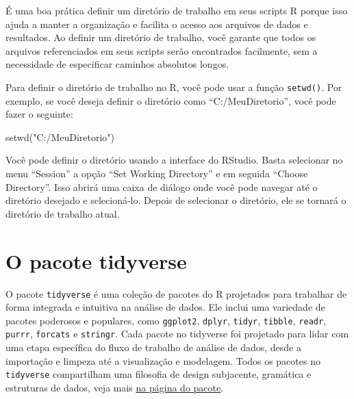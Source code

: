 \documentclass[
  portuguese,
  letterpaper,
  DIV=11,
  numbers=noendperiod]{scrreprt}
\newenvironment{Shaded}{\begin{snugshade}}{\end{snugshade}}
\newcommand{\FunctionTok}[1]{\textcolor[rgb]{0.28,0.35,0.67}{#1}}
\newcommand{\NormalTok}[1]{\textcolor[rgb]{0.00,0.23,0.31}{#1}}
\newcommand{\StringTok}[1]{\textcolor[rgb]{0.13,0.47,0.30}{#1}}
\theoremstyle{definition}
\theoremstyle{remark}
\begin{document}
\begin{tcolorbox}[enhanced jigsaw, leftrule=.75mm, opacitybacktitle=0.6, colback=white, coltitle=black, colframe=quarto-callout-tip-color-frame, titlerule=0mm, left=2mm, opacityback=0, breakable, bottomtitle=1mm, toprule=.15mm, title=\textcolor{quarto-callout-tip-color}{\faLightbulb}\hspace{0.5em}{Definindo o seu diretório de trabalho}, colbacktitle=quarto-callout-tip-color!10!white, arc=.35mm, rightrule=.15mm, bottomrule=.15mm, toptitle=1mm]

É uma boa prática definir um diretório de trabalho em seus scripts R
porque isso ajuda a manter a organização e facilita o acesso aos
arquivos de dados e resultados. Ao definir um diretório de trabalho,
você garante que todos os arquivos referenciados em seus scripts serão
encontrados facilmente, sem a necessidade de especificar caminhos
absolutos longos.

Para definir o diretório de trabalho no R, você pode usar a função
\texttt{setwd()}. Por exemplo, se você deseja definir o diretório como
``C:/MeuDiretorio'', você pode fazer o seguinte:

\begin{Shaded}
\begin{Highlighting}[]
\FunctionTok{setwd}\NormalTok{(}\StringTok{"C:/MeuDiretorio"}\NormalTok{)}
\end{Highlighting}
\end{Shaded}

Você pode definir o diretório usando a interface do RStudio. Basta
selecionar no menu ``Session'' a opção ``Set Working Directory'' e em
seguida ``Choose Directory''. Isso abrirá uma caixa de diálogo onde você
pode navegar até o diretório desejado e selecioná-lo. Depois de
selecionar o diretório, ele se tornará o diretório de trabalho atual.

\end{tcolorbox}

\section{O pacote tidyverse}\label{o-pacote-tidyverse}

O pacote \texttt{tidyverse} é uma coleção de pacotes do R projetados
para trabalhar de forma integrada e intuitiva na análise de dados. Ele
inclui uma variedade de pacotes poderosos e populares, como
\texttt{ggplot2}, \texttt{dplyr}, \texttt{tidyr}, \texttt{tibble},
\texttt{readr}, \texttt{purrr}, \texttt{forcats} e \texttt{stringr}.
Cada pacote no tidyverse foi projetado para lidar com uma etapa
específica do fluxo de trabalho de análise de dados, desde a importação
e limpeza até a visualização e modelagem. Todos os pacotes no
\texttt{tidyverse} compartilham uma filosofia de design subjacente,
gramática e estruturas de dados, veja mais
\href{https://www.tidyverse.org/}{na página do pacote}.
\end{document}
